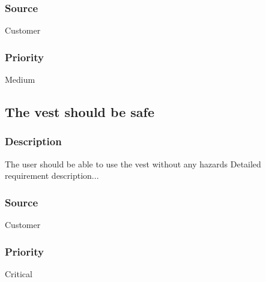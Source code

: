 \subsubsection{Source}
Customer
\subsubsection{Priority}
Medium

\subsection{The vest should be safe}
\subsubsection{Description}
The user should be able to use the vest without any hazards
Detailed requirement description...
\subsubsection{Source} 
Customer
\subsubsection{Priority}
Critical
